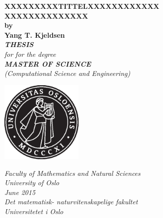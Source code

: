 \begin{center}      
	\vspace{5mm}        
	\LARGE
	\textbf{XXXXXXXXXTITTELXXXXXXXXXXXX\\ XXXXXXXXXXXXXX} \\
	\Large
	\vspace{5mm}
	\textbf{by} \\
	\vspace{5mm}
	\textbf{Yang T. Kjeldsen} \\
	\vspace{25mm}
	\Large
	{\bf{\textsl{THESIS}}} \\
	\textsl{for for the degree} \\
	\vspace{2mm}
		{\bf{\textsl{MASTER OF SCIENCE}}} \\
	\vspace{5mm}
	{\large \textsl {(Computational Science and Engineering)}}\\
	\vspace{10mm}
	\centerline{
	\includegraphics[width=4cm,height=4cm]{UiO_Segl_black.eps}}
	\vspace{5mm}
	\textsl{Faculty of Mathematics and Natural Sciences} \\
	\textsl{University of Oslo} \\
	\vspace{5mm}
	\large
	\textsl{June 2015} \\
	\vspace{5mm}
	\normalsize
	\textsl{Det matematisk- naturvitenskapelige fakultet} \\
	\textsl{Universitetet i Oslo} \\
\end{center}
